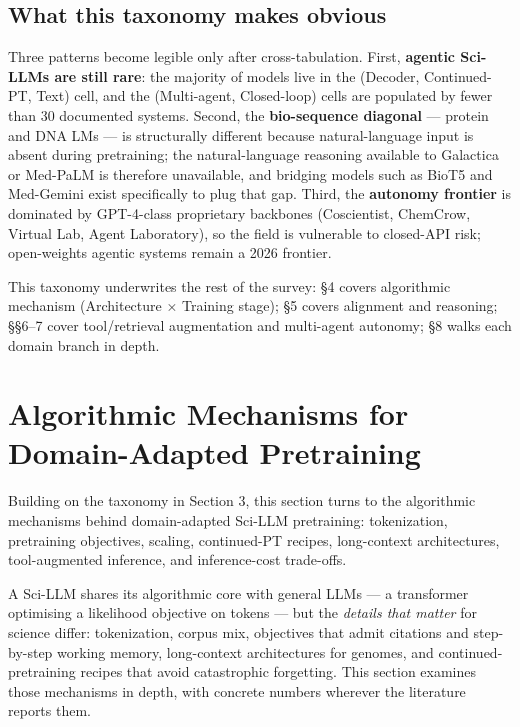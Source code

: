 \subsection{What this taxonomy makes obvious}\label{what-this-taxonomy-makes-obvious}

Three patterns become legible only after cross-tabulation. First, \textbf{agentic Sci-LLMs are still rare}: the majority of models live in the (Decoder, Continued-PT, Text) cell, and the (Multi-agent, Closed-loop) cells are populated by fewer than 30 documented systems. Second, the \textbf{bio-sequence diagonal} --- protein and DNA LMs --- is structurally different because natural-language input is absent during pretraining; the natural-language reasoning available to Galactica or Med-PaLM is therefore unavailable, and bridging models such as BioT5 and Med-Gemini exist specifically to plug that gap. Third, the \textbf{autonomy frontier} is dominated by GPT-4-class proprietary backbones (Coscientist, ChemCrow, Virtual Lab, Agent Laboratory), so the field is vulnerable to closed-API risk; open-weights agentic systems remain a 2026 frontier.

This taxonomy underwrites the rest of the survey: §4 covers algorithmic mechanism (Architecture × Training stage); §5 covers alignment and reasoning; §§6--7 cover tool/retrieval augmentation and multi-agent autonomy; §8 walks each domain branch in depth.

\section{Algorithmic Mechanisms for Domain-Adapted Pretraining}\label{algorithmic-mechanisms-for-domain-adapted-pretraining}

Building on the taxonomy in Section 3, this section turns to the algorithmic mechanisms behind domain-adapted Sci-LLM pretraining: tokenization, pretraining objectives, scaling, continued-PT recipes, long-context architectures, tool-augmented inference, and inference-cost trade-offs.

A Sci-LLM shares its algorithmic core with general LLMs --- a transformer optimising a likelihood objective on tokens --- but the \emph{details that matter} for science differ: tokenization, corpus mix, objectives that admit citations and step-by-step working memory, long-context architectures for genomes, and continued-pretraining recipes that avoid catastrophic forgetting. This section examines those mechanisms in depth, with concrete numbers wherever the literature reports them.


